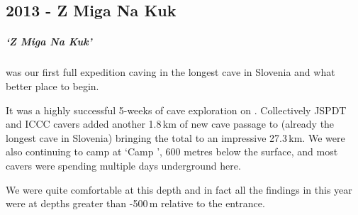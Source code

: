 \begin{tcolorbox}
	\chapter{2013 - Z Miga Na Kuk}
	\paragraph{`Z Miga Na Kuk'} was our first full expedition caving in the longest cave in Slovenia and what better place to begin. 

It was a highly successful 5-weeks of cave exploration on . Collectively JSPDT and ICCC cavers added another 1.8\,km of new cave passage to  (already the longest cave in Slovenia) bringing the total to an impressive 27.3\,km. We were also continuing to camp at `Camp \protect{}', 600 metres below the surface, and most cavers were spending multiple days underground here. 

We were quite comfortable at this depth and in fact all the findings in  this year were at depths greater than -500\,m relative to the entrance.

\end{tcolorbox}
\BgThispage
